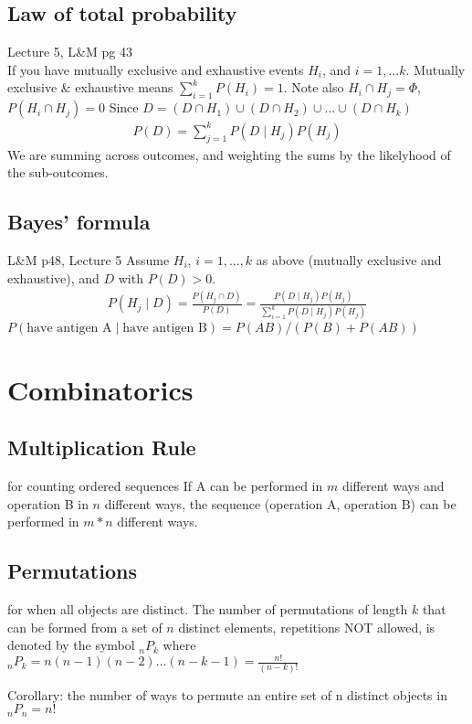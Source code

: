  \subsection{Law of total probability} {\tiny Lecture 5, L\&M pg 43}   \hfill \\
 If you have mutually exclusive and exhaustive events $H_i$, and $i = 1, \dots k$.  Mutually exclusive \& exhaustive means $\sum_{i=1}^k P(H_i) = 1$.  Note also $H_i \cap H_j = \Phi$, $P(H_i \cap H_j) = 0$  
 Since $D = (D \cap H_1) \cup (D \cap H_2) \cup \dots \cup  (D \cap H_k)$
	\begin{align*}
 		P(D) = \sum_{j=1}^k P(D \mid H_j) P(H_j) 
  	\end{align*}
We are summing across outcomes, and weighting the sums by the likelyhood of the sub-outcomes.
 
 \subsection{Bayes' formula} {\tiny L\&M p48, Lecture 5}
 Assume $H_i$, $i = 1, \dots, k$ as above (mutually exclusive and exhaustive), and $D$ with $P(D) > 0$.
 	\begin{align*}
		P(H_j \mid D) = \frac{P(H_j \cap D)}{P(D)} = \frac{P(D \mid H_j) P(H_j) }{\sum_{i=1}^k P(D \mid H_j) P(H_j) }
	\end{align*}
$P(\mbox{have antigen A} \mid \mbox{have antigen B}) = P(AB)/(P(B) + P(AB)) $
	

\section{Combinatorics}

\subsection{Multiplication Rule} for counting ordered sequences
If A can be performed in $m$ different ways and operation B in $n$ different ways, the sequence (operation A, operation B) can be performed in $m*n$ different ways. 

\subsection{Permutations} for when all objects are distinct.
The number of permutations of length $k$ that can be formed from a set of $n$ distinct elements, repetitions NOT allowed, is denoted by the symbol ${_n}P_k$ where ${_n}P_k = n(n-1)(n-2) \dots (n - k - 1) = \frac{n!}{(n-k)!}$ 

Corollary: the number of ways to permute an entire set of n distinct objects in ${_n}P_n = n!$ 

  

    
    
    
    
    
    
    
    
    
